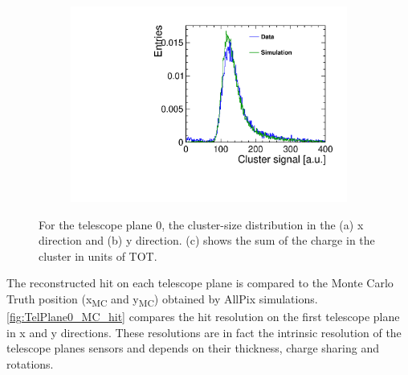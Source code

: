 \begin{figure}[htbp]
\begin{subfigure}[b]{0.3\textwidth}
    \includegraphics[width=\textwidth]{figures/Telescope/biasedResiduals/clusterSignal_telescope0_data_simu.pdf}
    \caption{}
  \end{subfigure}
  \caption{For the telescope plane 0, the cluster-size distribution in the (a) x direction and (b) y direction. (c) shows the sum of the charge in the cluster in units of TOT.} %
  \label{fig:TelescopeCluSize_data_simu}
\end{figure}

The reconstructed hit on each telescope plane is compared to the Monte
Carlo Truth position (x\textsubscript{MC} and y\textsubscript{MC})
obtained by AllPix simulations. \cref{fig:TelPlane0_MC_hit} compares
the hit resolution on the first telescope plane in x and y
directions. These resolutions are in fact the intrinsic resolution of
the telescope planes sensors and depends on their thickness, charge
sharing and rotations.

